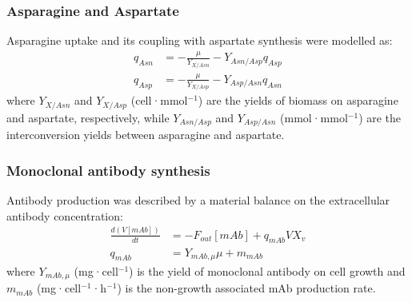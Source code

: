 \subsubsection*{Asparagine and Aspartate}
Asparagine uptake and its coupling with aspartate synthesis were modelled as:
\begin{align}
q_{Asn} &= -\frac{\mu}{Y_{X/Asn}} - Y_{Asn/Asp} q_{Asp} \\
q_{Asp} &= -\frac{\mu}{Y_{X/Asp}} - Y_{Asp/Asn} q_{Asn}
\end{align}
\noindent where $Y_{X/Asn}$ and $Y_{X/Asp}$ (cell·mmol$^{-1}$) are the yields of biomass on asparagine and aspartate, respectively, while $Y_{Asn/Asp}$ and $Y_{Asp/Asn}$ (mmol·mmol$^{-1}$) are the interconversion yields between asparagine and aspartate.

\subsubsection*{Monoclonal antibody synthesis}
Antibody production was described by a material balance on the extracellular antibody concentration:
\begin{align}
\frac{d(V[mAb])}{dt} &= -F_{out}[mAb] + q_{mAb}V X_v \\
q_{mAb} &= Y_{mAb,\mu}\mu + m_{mAb}
\end{align}
\noindent where $Y_{mAb,\mu}$ (mg·cell$^{-1}$) is the yield of monoclonal antibody on cell growth and $m_{mAb}$ (mg·cell$^{-1}$·h$^{-1}$) is the non-growth associated mAb production rate.

